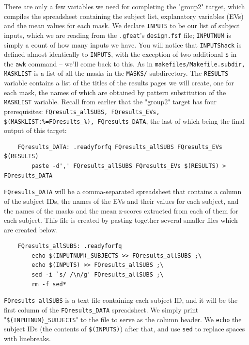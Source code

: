 There are only a few variables we need for completing the "group2" target, which compiles the spreadsheet containing the subject list, explanatory variables (EVs) and the mean values for each mask. We declare \texttt{INPUTS} to be our list of subject inputs, which we are reading from the \texttt{.gfeat}'s \texttt{design.fsf} file; \texttt{INPUTNUM} is simply a count of how many inputs we have. You will notice that \texttt{INPUTShack} is defined almost identically to \texttt{INPUTS}, with the exception of two additional \texttt{\$} in the \texttt{awk} command -- we'll come back to this. As in \texttt{makefiles/Makefile.subdir, MASKLIST} is a list of all the masks in the \texttt{MASKS/} subdirectory. The \texttt{RESULTS} variable contains a list of the titles of the results pages we will create, one for each mask, the names of which are obtained by pattern substitution of the \texttt{MASKLIST} variable. Recall from earlier that the "group2" target has four prerequisites: \texttt{FQresults_allSUBS, FQresults_EVs, \$(MASKLIST:\%=FQresults_\%), FQresults_DATA}, the last of which being the final output of this target:

\begin{lstlisting}	
	FQresults_DATA: .readyforfq FQresults_allSUBS FQresults_EVs $(RESULTS)
		paste -d',' FQresults_allSUBS FQresults_EVs $(RESULTS) > FQresults_DATA
\end{lstlisting}
\texttt{FQresults_DATA} will be a comma-separated spreadsheet that contains a column of the subject IDs, the names of the EVs and their values for each subject, and the names of the masks and the mean z-scores extracted from each of them for each subject. This file is created by pasting together several smaller files which are created below.

\begin{lstlisting}	
	FQresults_allSUBS: .readyforfq
		echo $(INPUTNUM)_SUBJECTS >> FQresults_allSUBS ;\
		echo $(INPUTS) >> FQresults_allSUBS ;\
		sed -i `s/ /\n/g' FQresults_allSUBS ;\
		rm -f sed*
\end{lstlisting}

\texttt{FQresults_allSUBS} is a text file containing each subject ID, and it will be the first column of the \texttt{FQresults_DATA} spreadsheet. We simply print "\texttt{\$(INPUTNUM)_SUBJECTS}" to the file to serve as the column header. We \texttt{echo} the subject IDs (the contents of \texttt{\$(INPUTS)}) after that, and use \texttt{sed} to replace spaces with linebreaks. 

